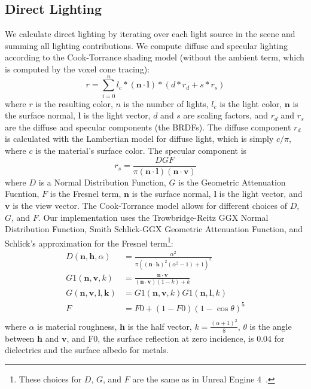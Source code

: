 
\subsection{Direct Lighting}
We calculate direct lighting by iterating over each light source in the scene and summing all lighting contributions. We compute diffuse and specular lighting according to the Cook-Torrance shading model (without the ambient term, which is computed by the voxel cone tracing):
\[
    r = \sum_{i=0}^{n} l_c * (\bm{n} \cdot \bm{l}) * (d * r_d + s * r_s)
\]
where $r$ is the resulting color, $n$ is the number of lights, $l_c$ is the light color, $\bm{n}$ is the surface normal, $\bm{l}$ is the light vector, $d$ and $s$ are scaling factors, and $r_d$ and $r_s$ are the diffuse and specular components (the BRDFs). The diffuse component $r_d$ is calculated with the Lambertian model for diffuse light, which is simply $c / \pi$, where $c$ is the material's surface color. The specular component is
\[
    r_s = \frac{DGF}{\pi (\bm{n} \cdot \bm{l}) (\bm{n} \cdot \bm{v})}
\]
where $D$ is a Normal Distribution Function, $G$ is the Geometric Attenuation Fucntion, $F$ is the Fresnel term, $\bm{n}$ is the surface normal, $\bm{l}$ is the light vector, and $\bm{v}$ is the view vector. The Cook-Torrance model allows for different choices of $D$, $G$, and $F$. Our implementation uses the Trowbridge-Reitz GGX Normal Distribution Function, Smith Schlick-GGX Geometric Attenuation Function, and Schlick's approximation for the Fresnel term\footnote{These choices for $D$, $G$, and $F$ are the same as in Unreal Engine 4~\cite{karis2013real}.}:
\begin{align*}
    D(\bm{n}, \bm{h}, \alpha) &= \frac{\alpha^2}{\pi ((\bm{n} \cdot \bm{h})^2 (\alpha^2 - 1) + 1)^2} \\
    G1(\bm{n}, \bm{v}, k) &= \frac{\bm{n} \cdot \bm{v}}{(\bm{n} \cdot \bm{v}) (1 - k) + k} \\
    G(\bm{n}, \bm{v}, \bm{l}, \bm{k}) &= G1(\bm{n}, \bm{v}, k) G1(\bm{n}, \bm{l}, k) \\
    F &= F0 + (1 - F0) (1 - \cos \theta)^5 \\
\end{align*}
where $\alpha$ is material roughness, $\bm{h}$ is the half vector, $k = \frac{(\alpha + 1)^2}{8}$, $\theta$ is the angle between $\bm{h}$ and $\bm{v}$, and F0, the surface reflection at zero incidence, is 0.04 for dielectrics and the surface albedo for metals.

